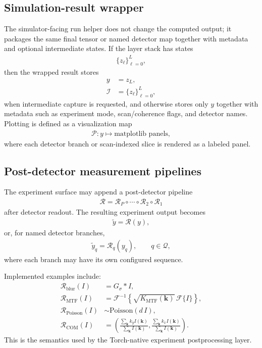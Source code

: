 \documentclass[11pt]{article}
\begin{document}
\subsection{Simulation-result wrapper}
The simulator-facing run helper does not change the computed output; it packages the
same final tensor or named detector map together with metadata and optional
intermediate states.  If the layer stack has states
\begin{align}
  \{z_\ell\}_{\ell=0}^{L},
\end{align}
then the wrapped result stores
\begin{align}
  y &= z_L, \\
  \mathcal{I} &= \{z_\ell\}_{\ell=0}^{L},
\end{align}
when intermediate capture is requested, and otherwise stores only $y$ together with
metadata such as experiment mode, scan/coherence flags, and detector names.  Plotting
is defined as a visualization map
\begin{align}
  \mathcal{P}: y \mapsto \text{matplotlib panels},
\end{align}
where each detector branch or scan-indexed slice is rendered as a labeled panel.

\subsection{Post-detector measurement pipelines}
The experiment surface may append a post-detector pipeline
\begin{align}
  \mathcal{R} = \mathcal{R}_P \circ \cdots \circ \mathcal{R}_2 \circ \mathcal{R}_1
\end{align}
after detector readout.  The resulting experiment output becomes
\begin{align}
  \tilde{y} = \mathcal{R}(y),
\end{align}
or, for named detector branches,
\begin{align}
  \tilde{y}_q = \mathcal{R}_q(y_q), \qquad q \in \mathcal{Q},
\end{align}
where each branch may have its own configured sequence.

Implemented examples include:
\begin{align}
  \mathcal{R}_{\mathrm{blur}}(I) &= G_\sigma * I, \\
  \mathcal{R}_{\mathrm{MTF}}(I) &= \mathcal{F}^{-1}\left\{
    \sqrt{K_{\mathrm{MTF}}(\mathbf{k})}\,\mathcal{F}\{I\}
  \right\}, \\
  \mathcal{R}_{\mathrm{Poisson}}(I) &\sim \mathrm{Poisson}(d\,I), \\
  \mathcal{R}_{\mathrm{COM}}(I) &= \left(
    \frac{\sum_{\mathbf{k}} k_y I(\mathbf{k})}{\sum_{\mathbf{k}} I(\mathbf{k})},
    \frac{\sum_{\mathbf{k}} k_x I(\mathbf{k})}{\sum_{\mathbf{k}} I(\mathbf{k})}
  \right).
\end{align}
This is the semantics used by the Torch-native experiment postprocessing layer.
\end{document}
